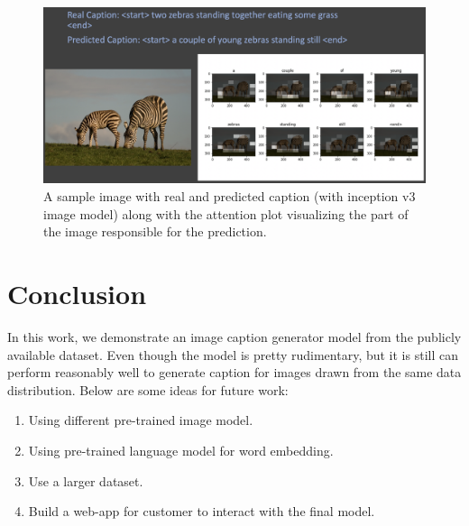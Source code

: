 \documentclass[12pt]{article}
\begin{document}
\begin{figure}[h!]
\begin{center}
\includegraphics[width=7in]{CI_2.png}
\end{center}
\caption{\label{fig:CI_2}
A sample image with real and predicted caption (with inception v3 image model) along with the attention plot visualizing the part of the image responsible for the prediction.}
\end{figure}

\section{Conclusion}
In this work, we demonstrate an image caption generator model from the publicly available dataset. Even though the model is pretty rudimentary, but it is still can perform reasonably well to generate caption for images drawn from the same data distribution. Below are some ideas for future work:

\begin{enumerate}
\item Using different pre-trained image model.
\item Using pre-trained language model for word embedding.
\item Use a larger dataset.
\item Build a web-app for customer to interact with the final model.
\end{enumerate}
\end{document}
